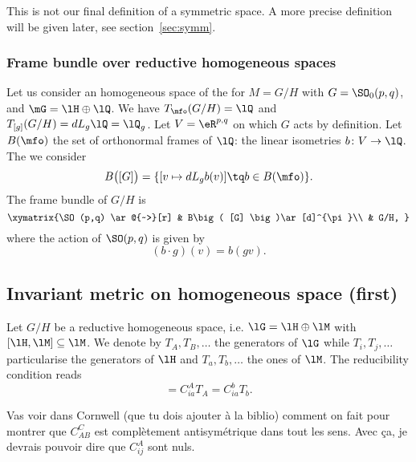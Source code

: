 \begin{remark}
This is not our final definition of a symmetric space. A more precise definition will be given later, see section~\ref{sec:symm}.
\end{remark}

					\subsubsection{Frame bundle over reductive homogeneous spaces}
\label{PgFrameHomo}

Let us consider an homogeneous space of the for $M=G/H$ with $G=\SO_0(p,q)$, and $\mG=\lH\oplus\lQ$. We have $T_{\mfo}(G/H)=\lQ$ and $T_{[g]}(G/H)=dL_g\lQ=\lQ_g$. Let $V=\eR^{p,q}$ on which $G$ acts by definition. Let $B(\mfo)$ the set of orthonormal frames of $\lQ$: the linear isometries $b\colon V\to \lQ$. The we consider
\begin{equation}
	B\big( [G] \big)=\{ [v\mapsto dL_gb(v)]\tq b\in B(\mfo) \}.
\end{equation}
The frame bundle of $G/H$ is
	\begin{equation}
\xymatrix{%
   \SO(p,q) \ar@{~>}[r]		&	B\big( [G] \big)\ar[d]^{\pi}\\
   				&	G/H,
 }
\end{equation}
where the action of $\SO(p,q)$ is given by
\begin{equation}
	(b\cdot g)(v)=b(gv).
\end{equation}

\subsection{Invariant metric on homogeneous space (first)}

Let $G/H$ be a reductive homogeneous space, i.e. $\lG=\lH\oplus\lM$ with $[\lH,\lM]\subseteq\lM$. We denote by $T_A,T_B,\ldots$ the generators of $\lG$ while $T_i,T_j,\ldots$ particularise the generators of $\lH$ and $T_a,T_b,\ldots$ the ones of $\lM$. The reducibility condition reads
\begin{equation}
  [T_i,T_a]=C_{ia}^AT_A=C_{ia}^bT_b.
\end{equation}

\begin{probleme}        \label{ProbAvecCorwell}
Vas voir dans Cornwell (que tu dois ajouter \`a la biblio) comment on fait pour montrer que $C_{AB}^C$ est complètement antisymétrique dans tout les sens. Avec \c ca, je devrais pouvoir dire que $C_{ij}^A$ sont nuls.
\end{probleme}


